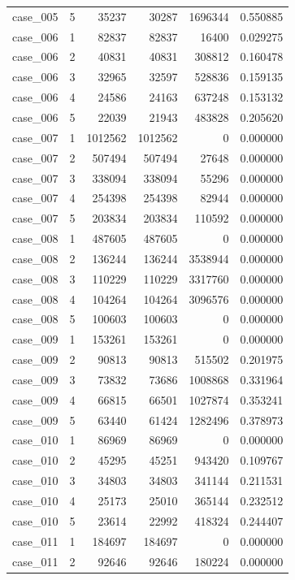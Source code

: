 \begin{longtable}{lrrrrr}
case\_005 & 5 & 35237 & 30287 & 1696344 & 0.550885 \\
case\_006 & 1 & 82837 & 82837 & 16400 & 0.029275 \\
case\_006 & 2 & 40831 & 40831 & 308812 & 0.160478 \\
case\_006 & 3 & 32965 & 32597 & 528836 & 0.159135 \\
case\_006 & 4 & 24586 & 24163 & 637248 & 0.153132 \\
case\_006 & 5 & 22039 & 21943 & 483828 & 0.205620 \\
case\_007 & 1 & 1012562 & 1012562 & 0 & 0.000000 \\
case\_007 & 2 & 507494 & 507494 & 27648 & 0.000000 \\
case\_007 & 3 & 338094 & 338094 & 55296 & 0.000000 \\
case\_007 & 4 & 254398 & 254398 & 82944 & 0.000000 \\
case\_007 & 5 & 203834 & 203834 & 110592 & 0.000000 \\
case\_008 & 1 & 487605 & 487605 & 0 & 0.000000 \\
case\_008 & 2 & 136244 & 136244 & 3538944 & 0.000000 \\
case\_008 & 3 & 110229 & 110229 & 3317760 & 0.000000 \\
case\_008 & 4 & 104264 & 104264 & 3096576 & 0.000000 \\
case\_008 & 5 & 100603 & 100603 & 0 & 0.000000 \\
case\_009 & 1 & 153261 & 153261 & 0 & 0.000000 \\
case\_009 & 2 & 90813 & 90813 & 515502 & 0.201975 \\
case\_009 & 3 & 73832 & 73686 & 1008868 & 0.331964 \\
case\_009 & 4 & 66815 & 66501 & 1027874 & 0.353241 \\
case\_009 & 5 & 63440 & 61424 & 1282496 & 0.378973 \\
case\_010 & 1 & 86969 & 86969 & 0 & 0.000000 \\
case\_010 & 2 & 45295 & 45251 & 943420 & 0.109767 \\
case\_010 & 3 & 34803 & 34803 & 341144 & 0.211531 \\
case\_010 & 4 & 25173 & 25010 & 365144 & 0.232512 \\
case\_010 & 5 & 23614 & 22992 & 418324 & 0.244407 \\
case\_011 & 1 & 184697 & 184697 & 0 & 0.000000 \\
case\_011 & 2 & 92646 & 92646 & 180224 & 0.000000 \\

\end{longtable}
